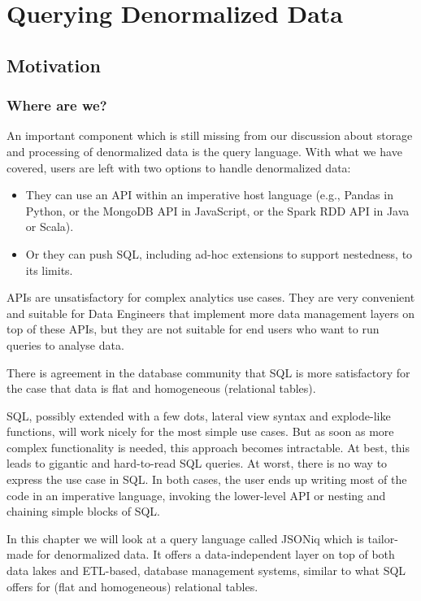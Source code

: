\section{Querying Denormalized Data}

\subsection{Motivation}

\subsubsection{Where are we?}

An important component which is still missing from our discussion about storage and processing of denormalized data is the query language. With what we have covered, users are left with two options to handle denormalized data:
\begin{itemize}
    \item They can use an API within an imperative host language (e.g., Pandas in Python, or the MongoDB API in JavaScript, or the Spark RDD API in Java or Scala).
    \item Or they can push SQL, including ad-hoc extensions to support nestedness, to its limits.
\end{itemize}

APIs are unsatisfactory for complex analytics use cases. They are very convenient and suitable for Data Engineers that implement more data management layers on top of these APIs, but they are not suitable for end users who want to run queries to analyse data.

There is agreement in the database community that SQL is more satisfactory for the case that data is flat and homogeneous (relational tables).

SQL, possibly extended with a few dots, lateral view syntax and explode-like functions, will work nicely for the most simple use cases. But as soon as more complex functionality is needed, this approach becomes intractable. At best, this leads to gigantic and hard-to-read SQL queries. At worst, there is no way to express the use case in SQL. In both cases, the user ends up writing most of the code in an imperative language, invoking the lower-level API or nesting and chaining simple blocks of SQL.

In this chapter we will look at a query language called JSONiq which is tailor-made for denormalized data. It offers a data-independent layer on top of both data lakes and ETL-based, database management systems, similar to what SQL offers for (flat and homogeneous) relational tables.


